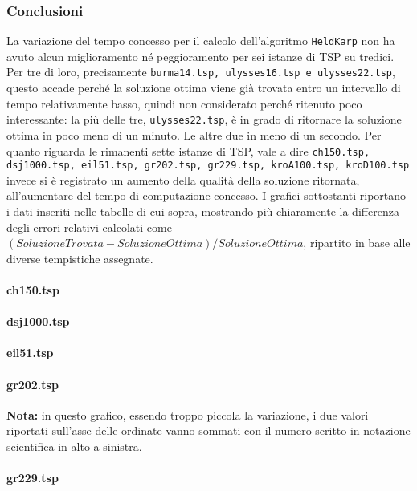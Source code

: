 \subsubsection{Conclusioni}
La variazione del tempo concesso per il calcolo dell'algoritmo \texttt{HeldKarp} non ha avuto alcun miglioramento né peggioramento per sei istanze di TSP su tredici. Per tre di loro, precisamente \texttt{burma14.tsp, ulysses16.tsp e ulysses22.tsp}, questo accade perché la soluzione ottima viene già trovata entro un intervallo di tempo relativamente basso, quindi non considerato perché ritenuto poco interessante: la più  delle tre, \texttt{ulysses22.tsp}, è in grado di ritornare la soluzione ottima in poco meno di un minuto. Le altre due in meno di un secondo.\eqcapo
Per quanto riguarda le rimanenti sette istanze di TSP, vale a dire \texttt{ch150.tsp, dsj1000.tsp, eil51.tsp, gr202.tsp, gr229.tsp, kroA100.tsp, kroD100.tsp} invece si è registrato un aumento della qualità della soluzione ritornata, all'aumentare del tempo di computazione concesso. I grafici sottostanti riportano i dati inseriti nelle tabelle di cui sopra, mostrando più chiaramente la differenza degli errori relativi calcolati come $(SoluzioneTrovata - SoluzioneOttima)/SoluzioneOttima$,  ripartito in base alle diverse tempistiche assegnate.
\paragraph*{ch150.tsp}
\paragraph*{dsj1000.tsp}
\paragraph*{eil51.tsp}
\paragraph*{gr202.tsp}
\textbf{Nota:} in questo grafico, essendo troppo piccola la variazione, i due valori riportati sull'asse delle ordinate vanno sommati con il numero scritto in notazione scientifica in alto a sinistra.
\paragraph*{gr229.tsp}
